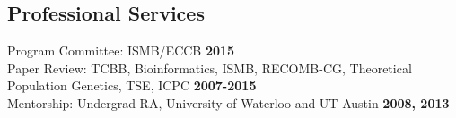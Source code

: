\documentclass[margin,line,letterpaper]{resume}
\begin{document}
\begin{resume}
    \section{\mysidestyle Professional Services}
    Program Committee: ISMB/ECCB  \hfill \textbf{2015}\vspace{1mm}\\
    Paper Review:  TCBB, Bioinformatics, ISMB, RECOMB-CG, Theoretical Population Genetics, TSE, ICPC    \hfill \textbf{2007-2015}\vspace{1mm}\\
    Mentorship: Undergrad RA, University of Waterloo and UT Austin  \hfill \textbf{2008, 2013}

% 
% 

\end{resume}
\end{document}
